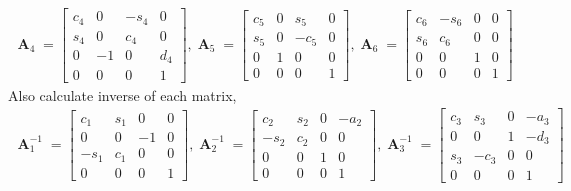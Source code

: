 \documentclass[12pt]{article}
\DeclareMathOperator{\A}{\mathbf{A}}
\begin{document}
  \begin{align*}
    \A_4 =
    \begin{bmatrix}
      c_4 & 0 & -s_4 & 0\\
      s_4 & 0 & c_4 & 0\\
      0 & -1 & 0 & d_4\\
      0 & 0 & 0 & 1
    \end{bmatrix},
    \A_5 =
    \begin{bmatrix}
      c_5 & 0 & s_5 & 0\\
      s_5 & 0 & -c_5 & 0\\
      0 & 1 & 0 & 0\\
      0 & 0 & 0 & 1
    \end{bmatrix},
    \A_6 =
    \begin{bmatrix}
      c_6 & -s_6 & 0 & 0\\
      s_6 & c_6 & 0 & 0\\
      0 & 0 & 1 & 0\\
      0 & 0 & 0 & 1
    \end{bmatrix}
  \end{align*}
  Also calculate inverse of each matrix,\\
  \begin{align*}
    \A_1^{-1} =
    \begin{bmatrix}
      c_1 & s_1 & 0 & 0\\
      0 & 0 & -1 & 0\\
      -s_1 & c_1 & 0 & 0\\
      0 & 0 & 0 & 1
    \end{bmatrix},
    \A_2^{-1} =
    \begin{bmatrix}
      c_2 & s_2 & 0 & -a_2\\
      -s_2 & c_2 & 0 & 0\\
      0 & 0 & 1 & 0\\
      0 & 0 & 0 & 1
    \end{bmatrix},
    \A_3^{-1} =
    \begin{bmatrix}
      c_3 & s_3 & 0 & -a_3\\
      0 & 0 & 1 & -d_3\\
      s_3 & -c_3 & 0 & 0\\
      0 & 0 & 0 & 1
    \end{bmatrix}
  \end{align*}
\end{document}
